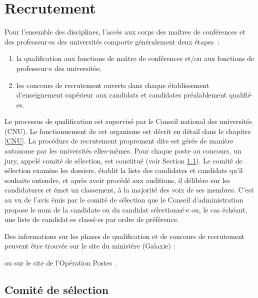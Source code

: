 \section{Recrutement}
\label{recrutement}

Pour l'ensemble des disciplines, l'acc\`es aux corps
des ma\^itres de conf\'erences et des professeur$\cdot$es des universit\'es comporte
g\'en\'eralement deux \'etapes~:
\begin{enumerate}
\item la qualification aux fonctions
de ma\^\i tre de conf\'erences et/ou aux fonctions de professeur$\cdot$e des
universit\'es;
\item les concours de recrutement ouverts dans chaque \'etablissement
d'enseignement sup\'erieur aux candidats et candidates pr\'ealablement
qualifi\'e$\cdot$es.
\end{enumerate}

Le processus de qualification est supervis\'e par le Conseil national des universit\'es (CNU).
Le fonctionnement de cet organisme est d\'ecrit en d\'etail dans le chapitre \ref{CNU}.
La proc\'edure de recrutement proprement dite est g\'er\'ee
de mani\`ere autonome par les universit\'es elles-m\^emes. Pour chaque poste au concours, un jury, appel\'e comit\'e de s\'election, est constitu\'e (voir Section \ref{sec. comiteselection}). Le comit\'e de s\'election examine les dossiers, \'etablit la liste des candidates et candidats qu'il souhaite entendre, et apr\`es avoir proc\'ed\'e aux auditions, il d\'elib\`ere sur les candidatures et \'emet un classement, \`a la majorit\'e des voix de ses membres. C'est au vu de l'avis \'emis par le comit\'e de s\'election que le Conseil d'administration propose le nom de la candidate ou du candidat s\'electionn\'e$\cdot$e ou, le cas \'ech\'eant, une liste de candidat$\cdot$es class\'e$\cdot$es par ordre de pr\'ef\'erence.

Des informations sur les phases de qualification et de concours de recrutement peuvent \^etre trouv\'ee sur le site du minist\`ere (Galaxie) :


ou sur le site de l'Op\'eration Postes .



\subsection{Comit\'e de s\'election}\label{sec. comiteselection}

